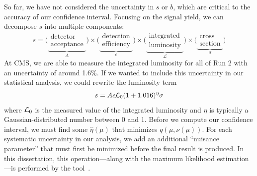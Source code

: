 So far, we have not considered the uncertainty in $s$ or $b$, which are critical to the accuracy of our confidence interval. 
Focusing on the signal yield, we can decompose $s$ into multiple components:
\begin{equation}
    s = \big(\underbrace{\substack{\text{detector} \\ \text{acceptance}}}_A\big)
        \times\big(\underbrace{\substack{\text{detection} \\ \text{efficiency}}}_\epsilon\big)
        \times\big(\underbrace{\substack{\text{integrated} \\ \text{luminosity}}}_\mathcal{L}\big)
        \times\big(\underbrace{\substack{\text{cross} \\ \text{section}}}_\sigma\big)
\end{equation}
At CMS, we are able to measure the integrated luminosity for all of Run 2 with an uncertainty of around 1.6\%. 
If we wanted to include this uncertainty in our statistical analysis, we could rewrite the luminosity term \Lumi
\begin{equation}
    s = A\epsilon\mathcal{L}_0(1 + 1.016)^\eta\sigma
\end{equation}
where $\mathcal{L}_0$ is the measured value of the integrated luminosity and $\eta$ is typically a Gaussian-distributed number between 0 and 1. 
Before we compute our confidence interval, we must find some $\hat{\eta}(\mu)$ that minimizes $q(\mu, \nu(\mu))$. 
For each systematic uncertainty in our analysis, we add an additional ``nuisance parameter'' that must first be minimized before the final result is produced. 
In this dissertation, this operation---along with the maximum likelihood estimation---is performed by the \COMBINE tool~\cite{CombinePaper}. 

